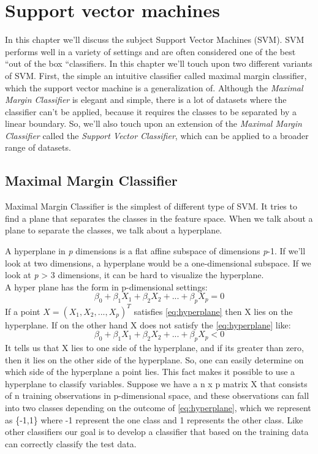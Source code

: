 
\chapter{Support vector machines}
In this chapter we’ll discuss the subject Support Vector Machines (SVM). SVM performs well in a variety of settings and are often considered one of the best “out of the box “classifiers.  In this chapter we’ll touch upon two different variants of SVM. First, the simple an intuitive classifier called maximal margin classifier, which the support vector machine is a generalization of. Although the \textit{Maximal Margin Classifier} is elegant and simple, there is a lot of datasets where the classifier can’t be applied, because it requires the classes to be separated by a linear boundary. So, we’ll also touch upon an extension of the \textit{Maximal Margin Classifier} called the \textit{Support Vector Classifier}, which can be applied to a broader range of datasets. 

\section{Maximal Margin Classifier}
Maximal Margin Classifier is the simplest of different type of SVM. It tries to find a plane that separates the classes in the feature space. When we talk about a plane to separate the classes, we talk about a hyperplane. 

A hyperplane in \textit{p} dimensions is a flat affine subspace of dimensions \textit{p}-1. If we’ll look at two dimensions, a hyperplane would be a one-dimensional subspace. If we look at \textit{p} > 3 dimensions, it can be hard to visualize the hyperplane. \\
A hyper plane has the form in p-dimensional settings: 
\begin{equation}
\beta_0 + \beta_1 X_1 + \beta_2 X_2 +...+ \beta_p X_p = 0\label{eq:hyperplane}
\end{equation}
If a point $X = (X_1 , X_2 ,..., X_p)^T$ satisfies \cref{eq:hyperplane} then X lies on the hyperplane. If on the other hand X does not satisfy the \cref{eq:hyperplane} like: 
\begin{equation}
\beta_0 + \beta_1 X_1 + \beta_2 X_2 +...+ \beta_p X_p < 0\label{ eq:hyperplane1 }
\end{equation}
It tells us that X lies to one side of the hyperplane, and if its greater than zero, then it lies on the other side of the hyperplane. So, one can easily determine on which side of the hyperplane a point lies. This fact makes it possible to use a hyperplane to classify variables. 
Suppose we have a n x p matrix X that consists of n training observations in p-dimensional space, and these observations can fall into two classes depending on the outcome of  \cref{eq:hyperplane}, which we represent as \{-1,1\} where -1 represent the one class and 1 represents the other class. 
Like other classifiers our goal is to develop a classifier that based on the training data can correctly classify the test data. 

